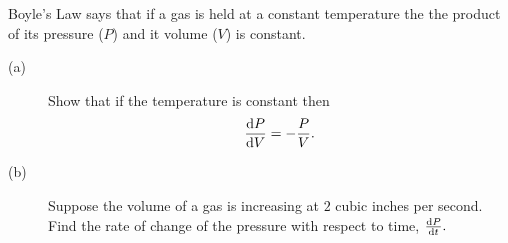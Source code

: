 \begin{ProblemSection}
  \begin{myproblem}{}
    Boyle's Law says that if a gas is held at a constant temperature
    the the product of its pressure ($P$) and it volume ($V$) is
    constant. 
    \begin{description}
    \item[(a)] Show that if the temperature is constant then 
\[\frac{\text{d}{P}}{\text{d}{V}} = -\frac{P}{V}.\]
\item[(b)] Suppose the volume of a gas is increasing at $2$ cubic
  inches per second. Find the rate of change of the pressure with
  respect to time, $\frac{\text{d}{P}}{\text{d}{t}}.$ 
    \end{description}
  \end{myproblem}

\end{ProblemSection}





